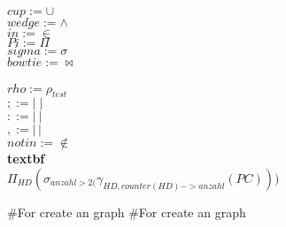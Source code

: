 \documentclass{article}
\begin{document}
$ cup := \cup$\\
$ wedge := \wedge$\\
$in := \in$\\
$ Pi := \Pi$\\
$sigma := \sigma$\\
$bowtie := \bowtie$\\\\
$rho := \rho_{test}$\\
$ ; :=|\;|$\\
$: := |\:|$\\
$, := |\,|$\\
$ notin := \notin$\\
\textbf{textbf}\\
$
	\Pi_{HD}(\sigma_{anzahl > 2(}\gamma_{HD, counter(HD) -> anzahl  }(PC)))
$


#For create an graph #For create an graph 
\usepackage{tikz}
\end{document}
